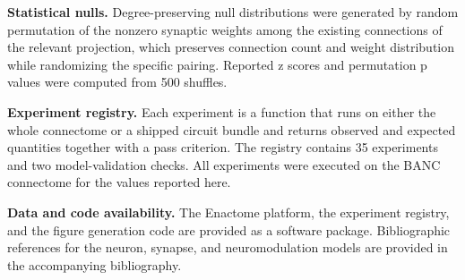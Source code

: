\documentclass[9pt,twocolumn,twoside]{article}
\begin{document}
\textbf{Statistical nulls.} Degree-preserving null distributions were generated by random permutation
of the nonzero synaptic weights among the existing connections of the relevant projection, which
preserves connection count and weight distribution while randomizing the specific pairing. Reported z
scores and permutation p values were computed from 500 shuffles.

\textbf{Experiment registry.} Each experiment is a function that runs on either the whole connectome
or a shipped circuit bundle and returns observed and expected quantities together with a pass
criterion. The registry contains 35 experiments and two model-validation checks. All experiments were
executed on the BANC connectome for the values reported here.

\textbf{Data and code availability.} The Enactome platform, the experiment registry, and the figure
generation code are provided as a software package. Bibliographic references for the neuron, synapse,
and neuromodulation models are provided in the accompanying bibliography.
\end{document}
